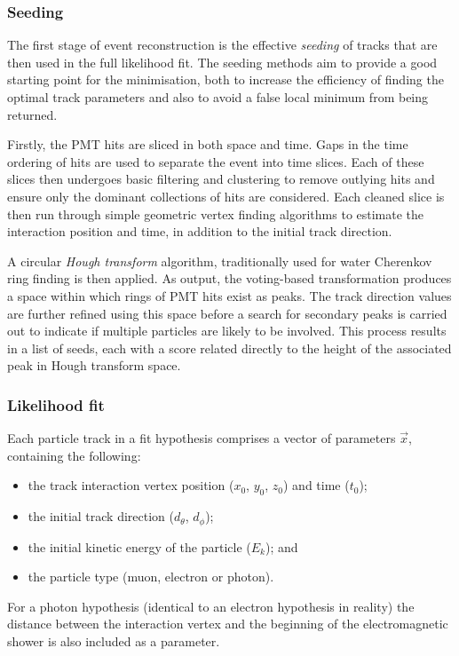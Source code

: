 \subsubsection*{Seeding} %

The first stage of event reconstruction is the effective \emph{seeding} of tracks that are then
used in the full likelihood fit. The seeding methods aim to provide a good starting point for the
minimisation, both to increase the efficiency of finding the optimal track parameters and also to
avoid a false local minimum from being returned.

Firstly, the PMT hits are sliced in both space and time. Gaps in the time ordering of hits are
used to separate the event into time slices. Each of these slices then undergoes basic filtering
and clustering to remove outlying hits and ensure only the dominant collections of hits are
considered. Each cleaned slice is then run through simple geometric vertex finding algorithms to
estimate the interaction position and time, in addition to the initial track direction.

A circular \emph{Hough transform} algorithm, traditionally used for water Cherenkov ring finding
is then applied. As output, the voting-based transformation produces a space within which rings of
PMT hits exist as peaks. The track direction values are further refined using this space before a
search for secondary peaks is carried out to indicate if multiple particles are likely to be
involved. This process results in a list of seeds, each with a score related directly to the
height of the associated peak in Hough transform space.

\subsubsection*{Likelihood fit} %


Each particle track in a fit hypothesis comprises a vector of parameters $\vec{x}$, containing the
following:
\begin{itemize}
    \item the track interaction vertex position ($x_{0}$, $y_{0}$, $z_{0}$) and time ($t_{0}$);
    \item the initial track direction ($d_{\theta}$, $d_{\phi}$);
    \item the initial kinetic energy of the particle ($E_{k}$); and
    \item the particle type (muon, electron or photon).
\end{itemize}
For a photon hypothesis (identical to an electron hypothesis in reality) the distance between the
interaction vertex and the beginning of the electromagnetic shower is also included as a
parameter.

